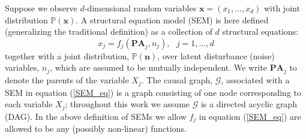 \documentclass[]{article}
\begin{document}
Suppose we observe $d$-dimensional random variables $\textbf{x}= (x_1, \ldots, x_d)$ 
with joint distribution $\mathbb{P}(\textbf{x})$.  %
%
A structural equation model (SEM) is here defined (generalizing the traditional definition) as a 
collection of $d$ 
structural equations:
\begin{equation}
\label{SEM_eq}
x_j = f_j ( \textbf{PA}_j, n_j), ~~ ~ j=1, \ldots ,d
\end{equation}
together with a joint distribution, $\mathbb{P}(\textbf{n})$, %
over latent disturbance (noise)
variables, $n_j$,  which are assumed to be mutually  independent. 
We write $\textbf{PA}_j$ to denote the parents of the variable $X_j$. 
The causal graph, $\mathcal{G}$, associated with 
a SEM in equation (\ref{SEM_eq})
is a graph
consisting of one node corresponding to each variable $X_j$;
throughout this work we assume $\mathcal{G}$ 
is a directed acyclic graph (DAG). %
%
In the above definition of SEMs we allow 
$f_j$ in equation (\ref{SEM_eq}) are allowed to be any
(possibly non-linear) functions.
\end{document}
